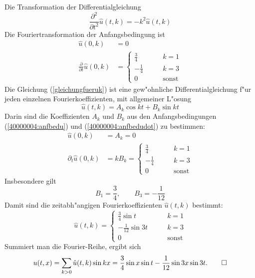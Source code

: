 \begin{loesung}
Die Transformation der Differentialgleichung 
\begin{equation}
\frac{\partial^2}{\partial t^2}\hat u(t,k)
=-k^2\hat u(t,k)
\label{gleichungfueruk}
\end{equation}
Die Fouriertransformation der Anfangsbedingung ist
\begin{align}
\hat u(0,k)&=0\label{40000004:anfbedu}\\
\frac{\partial}{\partial t}\hat u(0,k)&=
\begin{cases}
\frac34&\qquad k= 1\\
-\frac14&\qquad k= 3\\
0&\qquad \text{sonst}
\end{cases}
\label{40000004:anfbedudot}
\end{align}
Die Gleichung
(\ref{gleichungfueruk})
ist eine gew"ohnliche Differentialgleichung f"ur jeden
einzelnen Fourierkoeffizienten, mit allgemeiner L"osung
\[
\hat u(t,k)=A_k\cos kt+B_k\sin kt
\]
Darin sind die Koeffizienten $A_k$ und $B_k$ aus den Anfangsbedingungen
(\ref{40000004:anfbedu}) und (\ref{40000004:anfbedudot}) zu bestimmen:
\begin{align*}
\hat u(0,k)&=A_k=0\\
\partial_t \hat u(0,k)&=kB_k=
\begin{cases}
\frac34&\qquad k= 1\\
-\frac14&\qquad k= 3\\
0&\qquad \text{sonst}
\end{cases}
\end{align*}
Insbesondere gilt
\[
B_1=\frac34,\qquad B_3=-\frac1{12}
\]
Damit sind die zeitabh"angigen Fourierkoeffizienten $\hat u(t,k)$ bestimmt:
\[
\hat u(t,k)=
\begin{cases}
\frac34\sin t &\qquad k= 1\\
-\frac1{12}\sin 3t&\qquad k= 3\\
0&\qquad \text{sonst}
\end{cases}
\]
Summiert man die Fourier-Reihe, ergibt sich
\[
u(t,x)=\sum_{k>0}\hat u(t,k) \sin kx
= \frac34\sin x \sin t -\frac1{12}\sin 3x \sin 3t.
\qedhere
\]
\end{loesung}
 
